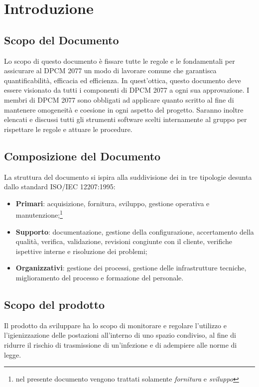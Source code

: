 \section{Introduzione}

\subsection{Scopo del Documento}
Lo scopo di questo documento è fissare tutte le  regole e le  fondamentali per assicurare al  DPCM 2077 un modo di lavorare comune che garantisca quantificabilità, efficacia ed efficienza.
In quest’ottica, questo documento deve essere visionato da tutti i componenti di DPCM 2077 a ogni sua approvazione. 
I membri di DPCM 2077 sono obbligati ad applicare quanto scritto al fine di mantenere omogeneità e coesione in ogni aspetto del progetto. Saranno inoltre elencati e discussi tutti gli   
strumenti software scelti internamente al gruppo per rispettare le regole e attuare le procedure.

\subsection{Composizione del Documento}
La struttura del documento si ispira alla suddivisione dei  in tre tipologie desunta dallo standard ISO/IEC 12207:1995:
\begin{itemize}
\item{\textbf{Primari}: acquisizione, fornitura, sviluppo, gestione operativa e manutenzione;\footnote{nel presente documento vengono trattati solamente \textit{fornitura} e \textit{sviluppo}}}
\item{\textbf{Supporto}: documentazione, gestione della configurazione, accertamento della qualità, verifica, validazione, revisioni congiunte con il cliente, verifiche ispettive interne e risoluzione dei problemi;}
\item{\textbf{Organizzativi}: gestione dei processi, gestione delle infrastrutture tecniche, miglioramento del processo e formazione del personale.}
\end{itemize}

\subsection{Scopo del prodotto}
Il prodotto da sviluppare ha lo scopo di monitorare e regolare l'utilizzo e l'igienizzazione delle postazioni all'interno di uno spazio condiviso, al fine di ridurre il rischio di trasmissione di un'infezione e di adempiere alle norme di legge. 
